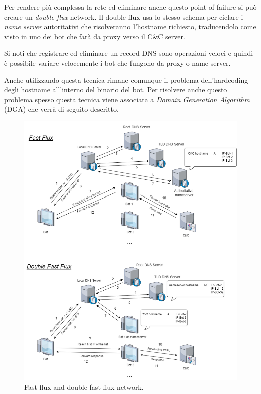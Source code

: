 Per rendere più complessa la rete ed eliminare anche questo point of failure si può creare un  \textit{double-flux} network. Il double-flux usa lo stesso schema per ciclare i \textit{name server} autoritativi che risolveranno l'hostname richiesto, traducendolo come visto in uno dei bot che farà da proxy verso il C\&C server. 

Si noti che registrare ed eliminare un  record DNS sono operazioni veloci e quindi è possibile variare velocemente i bot che fungono da proxy o name server.

Anche utilizzando questa tecnica rimane comunque il problema dell'hardcoding degli hostname all'interno del binario del bot. Per risolvere anche questo problema spesso  questa tecnica viene associata a \textit{Domain Generation Algorithm} (DGA) che verrà di seguito descritto.

\begin{figure}[hbtp]
    \centering
    \includegraphics[width=\textwidth]{res/fig/fastflux.png}
    \caption{Fast flux and double fast flux network.}
    \label{fig:fast-flux}
\end{figure}

